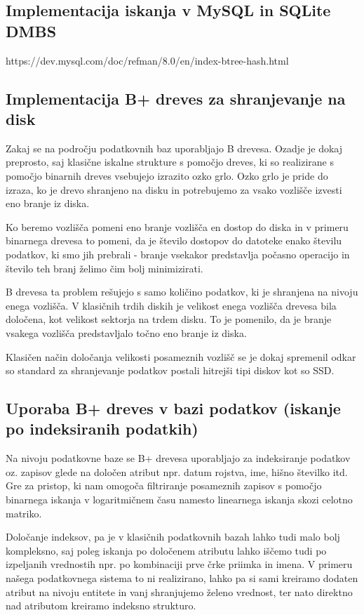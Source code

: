\documentclass[a4paper,12pt,openright]{book}
\begin{document}
        \subsection{Implementacija iskanja v MySQL in SQLite DMBS}
        \colorbox{BurntOrange}{https://dev.mysql.com/doc/refman/8.0/en/index-btree-hash.html}

        \subsection{Implementacija B+ dreves za shranjevanje na disk}
        Zakaj se na področju podatkovnih baz uporabljajo B drevesa. Ozadje je dokaj preprosto, saj klasične iskalne strukture s pomočjo dreves, ki so realizirane s pomočjo binarnih dreves vsebujejo izrazito ozko grlo. Ozko grlo je pride do izraza, ko je drevo shranjeno na disku in potrebujemo za vsako vozlišče izvesti eno branje iz diska.

        Ko beremo vozlišča pomeni eno branje vozlišča en dostop do diska in v primeru binarnega drevesa to pomeni, da je število dostopov do datoteke enako številu podatkov, ki smo jih prebrali - branje vsekakor predstavlja počasno operacijo in število teh branj želimo čim bolj minimizirati.

        B drevesa ta problem rešujejo s samo količino podatkov, ki je shranjena na nivoju enega vozlišča. V klasičnih trdih diskih je velikost enega vozlišča drevesa bila določena, kot velikost sektorja na trdem disku. To je pomenilo, da je branje vsakega vozlišča predstavljalo točno eno branje iz diska.

        Klasičen način določanja velikosti posameznih vozlišč se je dokaj spremenil odkar so standard za shranjevanje podatkov postali hitrejši tipi diskov kot so SSD.
        
        \subsection{Uporaba B+ dreves v bazi podatkov (iskanje po indeksiranih podatkih)}
        Na nivoju podatkovne baze se B+ drevesa uporabljajo za indeksiranje podatkov oz. zapisov glede na določen atribut npr. datum rojstva, ime, hišno številko itd. Gre za pristop, ki nam omogoča filtriranje posameznih zapisov s pomočjo binarnega iskanja v logaritmičnem času namesto linearnega iskanja skozi celotno matriko.
        
        Določanje indeksov, pa je v klasičnih podatkovnih bazah lahko tudi malo bolj kompleksno, saj poleg iskanja po določenem atributu lahko iščemo tudi po izpeljanih vrednostih npr. po kombinaciji prve črke priimka in imena. V primeru našega podatkovnega sistema to ni realizirano, lahko pa si sami kreiramo dodaten atribut na nivoju entitete in vanj shranjujemo želeno vrednost, ter nato direktno nad atributom kreiramo indeksno strukturo.
        
\end{document}
